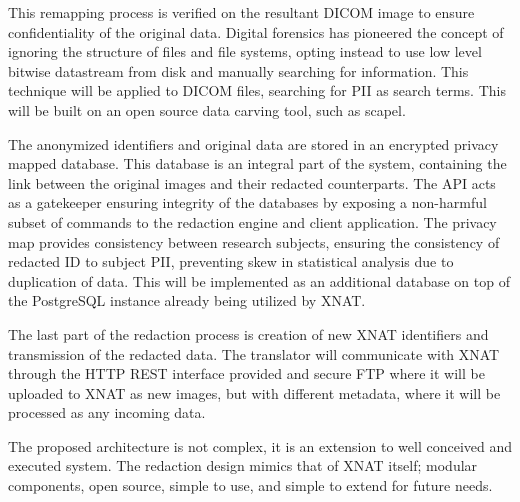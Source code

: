 This remapping process is verified on the resultant DICOM image to ensure confidentiality of the original data. Digital forensics has pioneered the concept of ignoring the structure of files and file systems, opting instead to use low level bitwise datastream from disk and manually searching for information. This technique will be applied to DICOM files, searching for PII as search terms. This will be built on an open source data carving tool, such as scapel\cite{scapel}.

The anonymized identifiers and original data are stored in an encrypted privacy mapped database. This database is an integral part of the system, containing the link between the original images and their redacted counterparts. The API acts as a gatekeeper ensuring integrity of the databases by exposing a non-harmful subset of commands to the redaction engine and client application. The privacy map provides consistency between research subjects, ensuring the consistency of redacted ID to subject PII, preventing skew in statistical analysis due to duplication of data. This will be implemented as an additional database on top of the PostgreSQL instance already being utilized by XNAT. 

The last part of the redaction process is creation of new XNAT identifiers and transmission of the redacted data. The translator will communicate with XNAT through the HTTP REST interface provided \cite{fielding2000} and secure FTP where it will be uploaded to XNAT as new images, but with different metadata, where it will be processed as any incoming data. 

The proposed architecture is not complex, it is an extension to well conceived and executed system. The redaction design mimics that of XNAT itself; modular components, open source, simple to use, and simple to extend for future needs. 